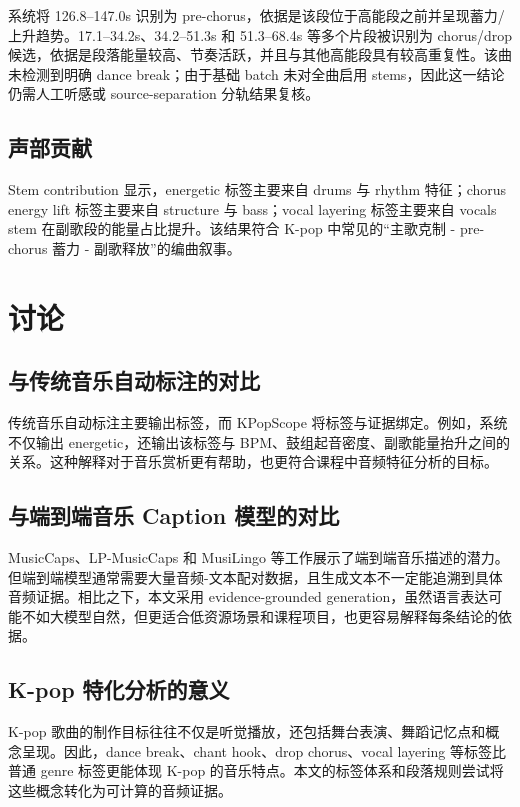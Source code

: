 \documentclass[UTF8,zihao=-4]{ctexart}
\newcommand{\method}{KPopScope}
\begin{document}
系统将 126.8--147.0s 识别为 pre-chorus，依据是该段位于高能段之前并呈现蓄力/上升趋势。17.1--34.2s、34.2--51.3s 和 51.3--68.4s 等多个片段被识别为 chorus/drop 候选，依据是段落能量较高、节奏活跃，并且与其他高能段具有较高重复性。该曲未检测到明确 dance break；由于基础 batch 未对全曲启用 stems，因此这一结论仍需人工听感或 source-separation 分轨结果复核。

\subsection{声部贡献}

Stem contribution 显示，energetic 标签主要来自 drums 与 rhythm 特征；chorus energy lift 标签主要来自 structure 与 bass；vocal layering 标签主要来自 vocals stem 在副歌段的能量占比提升。该结果符合 K-pop 中常见的“主歌克制 - pre-chorus 蓄力 - 副歌释放”的编曲叙事。

\section{讨论}

\subsection{与传统音乐自动标注的对比}

传统音乐自动标注主要输出标签，而 \method{} 将标签与证据绑定。例如，系统不仅输出 energetic，还输出该标签与 BPM、鼓组起音密度、副歌能量抬升之间的关系。这种解释对于音乐赏析更有帮助，也更符合课程中音频特征分析的目标。

\subsection{与端到端音乐 Caption 模型的对比}

MusicCaps、LP-MusicCaps 和 MusiLingo 等工作展示了端到端音乐描述的潜力\cite{musiccaps2023,doh2023lpmusiccaps,deng2023musilingo}。但端到端模型通常需要大量音频-文本配对数据，且生成文本不一定能追溯到具体音频证据。相比之下，本文采用 evidence-grounded generation，虽然语言表达可能不如大模型自然，但更适合低资源场景和课程项目，也更容易解释每条结论的依据。

\subsection{K-pop 特化分析的意义}

K-pop 歌曲的制作目标往往不仅是听觉播放，还包括舞台表演、舞蹈记忆点和概念呈现。因此，dance break、chant hook、drop chorus、vocal layering 等标签比普通 genre 标签更能体现 K-pop 的音乐特点。本文的标签体系和段落规则尝试将这些概念转化为可计算的音频证据。
\end{document}
